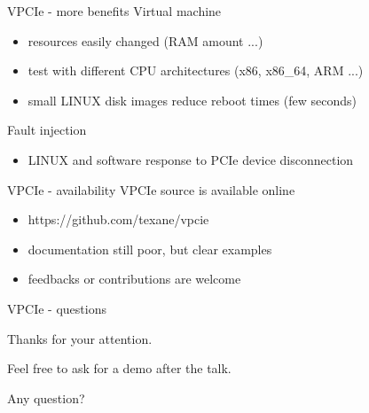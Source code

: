 \documentclass{beamer}
\begin{document}
\begin{frame}{VPCIe - more benefits}
  Virtual machine
  \begin{itemize}
  \item resources easily changed (RAM amount ...)
  \item test with different CPU architectures (x86, x86\_64, ARM ...)
  \item small LINUX disk images reduce reboot times (few seconds)
  \end{itemize}
  Fault injection
  \begin{itemize}
  \item LINUX and software response to PCIe device disconnection
  \end{itemize}
\end{frame}

\begin{frame}{VPCIe - availability}
  VPCIe source is available online
  \begin{itemize}
  \item https://github.com/texane/vpcie
  \item documentation still poor, but clear examples
  \item feedbacks or contributions are welcome
  \end{itemize}
\end{frame}

\begin{frame}{VPCIe - questions}
  \begin{center} Thanks for your attention. \end{center}
  \begin{center} Feel free to ask for a demo after the talk. \end{center}
  \begin{center} Any question? \end{center}
\end{frame}
\end{document}
